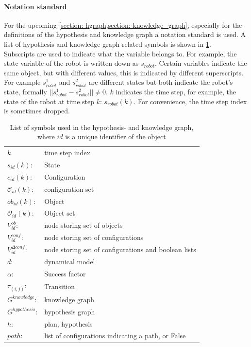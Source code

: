 \paragraph{Notation standard}
For the upcoming \cref{section: hgraph,section: knowledge_graph}, especially for the definitions of the hypothesis and knowledge graph a notation standard is used. A list of hypothesis and knowledge graph related symbols is shown in \cref{table: symbol_list_hgraph}.\\

Subscripts are used to indicate what the variable belongs to. For example, the state variable of the robot is written down as $s_{robot}$. Certain variables indicate the same object, but with different values, this is indicated by different superscripts. For example $s_{robot}^1$ and $s_{robot}^2$ are different states but both indicate the robot's state, formally $||s_{robot}^1-s_{robot}^2|| \neq 0$. $k$ indicates the time step, for example, the state of the robot at time step $k$: $s_{robot}(k)$. For convenience, the time step index is sometimes dropped. \\ 

\renewcommand{\arraystretch}{1.2}
\begin{table}[H]
    \centering
    \begin{tabular}{p{2cm} l }
        $k$ & \textrm{time step index}\\
        $s_{id}(k)$: & \textrm{State}\\
        $c_{id}(k)$: & \textrm{Configuration}\\
        $\mathcal{C}_{id}(k)$: & \textrm{configuration set}\\
        $ob_{id}(k)$: & \textrm{Object}\\
        $\mathcal{O}_{id}(k):$ & \textrm{Object set}\\
        $V^{ob}_{id}$: & \textrm{node storing set of objects}\\
        $V^{conf}_{id}$: & \textrm{node storing set of configurations}\\
        $V^{\Delta conf}_{id}$: & \textrm{node storing set of configurations and boolean lists}\\
       $d$: & \textrm{dynamical model}\\
        $\alpha$: & Success factor\\
        $\tau_{(i,j)}$: & \textrm{Transition}\\
        $G^{knowledge}$: & \textrm{knowledge graph}\\
        $G^{hypothesis}$: & \textrm{hypothesis graph}\\
        $h$: & \textrm{plan, hypothesis}\\
        $path$: & \textrm{list of configurations indicating a path, or False}
   \end{tabular}
    \caption{List of symbols used in the hypothesis- and knowledge graph, where $id$ is a unique identifier of the object}
    \label{table: symbol_list_hgraph}
\end{table}

